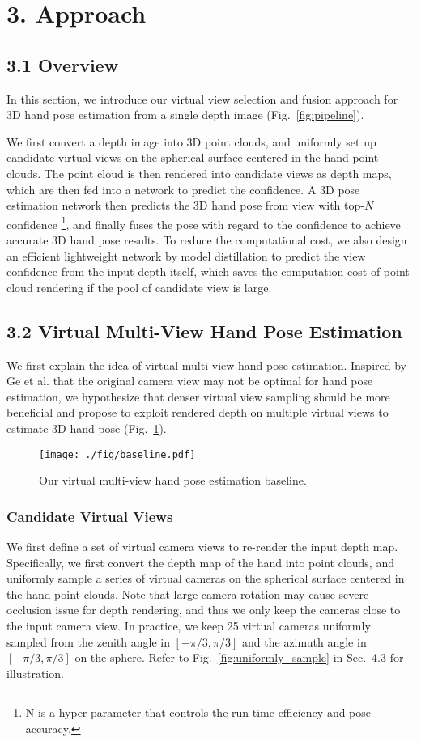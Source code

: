 \documentclass[letterpaper]{article} \usepackage{aaai22}  \usepackage{times}  \usepackage{helvet}  \usepackage{courier}  \usepackage[hyphens]{url}  \usepackage{graphicx} \urlstyle{rm} \def\UrlFont{\rm}  \usepackage{natbib}  \usepackage{caption} \DeclareCaptionStyle{ruled}{labelfont=normalfont,labelsep=colon,strut=off} \frenchspacing  \setlength{\pdfpagewidth}{8.5in}  \setlength{\pdfpageheight}{11in}  \usepackage{algorithm}
\begin{document}
\section{3. Approach}

\subsection{3.1 Overview}
In this section, we introduce our virtual view selection and fusion approach for 3D hand pose estimation from a single depth image (Fig.~\ref{fig:pipeline}). 

We first convert a depth image into 3D point clouds, and uniformly set up candidate virtual views on the spherical surface centered in the hand point clouds.
The point cloud is then rendered into candidate views as depth maps, which are then fed into a network to predict the confidence.
A 3D pose estimation network then predicts the 3D hand pose from view with top-$N$ confidence \footnote{N is a hyper-parameter that controls the run-time efficiency and pose accuracy.}, and finally fuses the pose with regard to the confidence to achieve accurate 3D hand pose results. 
To reduce the computational cost, we also design an efficient lightweight network by model distillation to predict the view confidence from the input depth itself, which saves the computation cost of point cloud rendering if the pool of candidate view is large.

\subsection{3.2 Virtual Multi-View Hand Pose Estimation}
We first explain the idea of virtual multi-view hand pose estimation.
Inspired by Ge et al. \cite{ge2016robust} that the original camera view may not be optimal for hand pose estimation, we hypothesize that denser virtual view sampling should be more beneficial and propose to exploit rendered depth on multiple virtual views to estimate 3D hand pose (Fig.~\ref{fig:baseline}).

\begin{figure}[h]
\centering 
\texttt{[image: ./fig/baseline.pdf]}
\caption{Our virtual multi-view hand pose estimation baseline.}
\label{fig:baseline}
\end{figure}

\subsubsection{Candidate Virtual Views}
We first define a set of virtual camera views to re-render the input depth map.
Specifically, we first convert the depth map of the hand into point clouds, and uniformly sample a series of virtual cameras on the spherical surface centered in the hand point clouds.
Note that large camera rotation may cause severe  occlusion issue for depth rendering, and thus we only keep the cameras close to the input camera view.
In practice, we keep 25 virtual cameras uniformly sampled from 
the zenith angle in $[-\pi/3,\pi/3]$ and the azimuth angle in $[-\pi/3,\pi/3]$ on the sphere.  Refer to Fig.~\ref{fig:uniformly_sample} in Sec.~4.3 for illustration.
\end{document}
